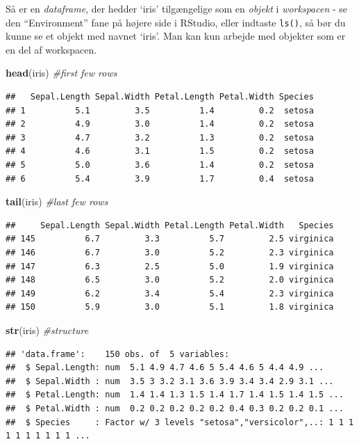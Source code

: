 \documentclass[
]{book}
\newenvironment{Shaded}{\begin{snugshade}}{\end{snugshade}}
\newcommand{\CommentTok}[1]{\textcolor[rgb]{0.56,0.35,0.01}{\textit{#1}}}
\newcommand{\FunctionTok}[1]{\textcolor[rgb]{0.13,0.29,0.53}{\textbf{#1}}}
\newcommand{\NormalTok}[1]{#1}
\theoremstyle{definition}
\theoremstyle{definition}
\theoremstyle{definition}
\theoremstyle{definition}
\theoremstyle{remark}
\begin{document}
Så er en \emph{dataframe}, der hedder `iris' tilgængelige som en \emph{objekt} i \emph{workspacen} - se den ``Environment'' fane på højere side i RStudio, eller indtaste \texttt{ls()}, så bør du kunne se et objekt med navnet `iris'. Man kan kun arbejde med objekter som er en del af workspacen.

\begin{Shaded}
\begin{Highlighting}[]
\FunctionTok{head}\NormalTok{(iris) }\CommentTok{\#first few rows}
\end{Highlighting}
\end{Shaded}

\begin{verbatim}
##   Sepal.Length Sepal.Width Petal.Length Petal.Width Species
## 1          5.1         3.5          1.4         0.2  setosa
## 2          4.9         3.0          1.4         0.2  setosa
## 3          4.7         3.2          1.3         0.2  setosa
## 4          4.6         3.1          1.5         0.2  setosa
## 5          5.0         3.6          1.4         0.2  setosa
## 6          5.4         3.9          1.7         0.4  setosa
\end{verbatim}

\begin{Shaded}
\begin{Highlighting}[]
\FunctionTok{tail}\NormalTok{(iris) }\CommentTok{\#last few rows}
\end{Highlighting}
\end{Shaded}

\begin{verbatim}
##     Sepal.Length Sepal.Width Petal.Length Petal.Width   Species
## 145          6.7         3.3          5.7         2.5 virginica
## 146          6.7         3.0          5.2         2.3 virginica
## 147          6.3         2.5          5.0         1.9 virginica
## 148          6.5         3.0          5.2         2.0 virginica
## 149          6.2         3.4          5.4         2.3 virginica
## 150          5.9         3.0          5.1         1.8 virginica
\end{verbatim}

\begin{Shaded}
\begin{Highlighting}[]
\FunctionTok{str}\NormalTok{(iris) }\CommentTok{\#structure}
\end{Highlighting}
\end{Shaded}

\begin{verbatim}
## 'data.frame':    150 obs. of  5 variables:
##  $ Sepal.Length: num  5.1 4.9 4.7 4.6 5 5.4 4.6 5 4.4 4.9 ...
##  $ Sepal.Width : num  3.5 3 3.2 3.1 3.6 3.9 3.4 3.4 2.9 3.1 ...
##  $ Petal.Length: num  1.4 1.4 1.3 1.5 1.4 1.7 1.4 1.5 1.4 1.5 ...
##  $ Petal.Width : num  0.2 0.2 0.2 0.2 0.2 0.4 0.3 0.2 0.2 0.1 ...
##  $ Species     : Factor w/ 3 levels "setosa","versicolor",..: 1 1 1 1 1 1 1 1 1 1 ...
\end{verbatim}
\end{document}
